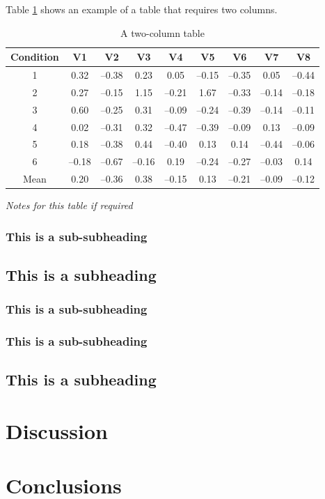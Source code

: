 \documentclass[paper=a4,fontsize=11pt,twocolumn]{article}
\begin{document}
Table \ref{tab:two-column} shows an example of a table that requires two columns.

\begin{table}
\begin{centering}
\caption{A two-column table}\label{tab:two-column}%
	\begin{tabular}[\columnwidth]{ccccccccc}\toprule
	Condition & V1 & V2 & V3 & V4 & V5 & V6 & V7 & V8 \\
	\midrule
	1 & 0.32 & --0.38 & 0.23 & 0.05 & --0.15 & --0.35 & 0.05 & --0.44 \\
	2 & 0.27 & --0.15 & 1.15 & --0.21 & 1.67 & --0.33 & --0.14 & --0.18 \\
	3 & 0.60 & --0.25 & 0.31 & --0.09 & --0.24 & --0.39 & --0.14 & --0.11 \\
	4 & 0.02 & --0.31 & 0.32 & --0.47 & --0.39 & --0.09 & 0.13 & --0.09 \\
	5 & 0.18 & --0.38 & 0.44 & --0.40 & 0.13 & 0.14 & --0.44 & --0.06 \\
	6 & --0.18 & --0.67 & --0.16 & 0.19 & --0.24 & --0.27 & --0.03 & 0.14 \\
	\cmidrule{2-9}
	Mean & 0.20 & --0.36 & 0.38 & --0.15 & 0.13 & --0.21 & --0.09 & --0.12 \\
	\bottomrule
	\end{tabular}\par
	\medskip
\textit{Notes for this table if required}
\end{centering}
\end{table}

\lipsum[12]
\subsubsection{This is a sub-subheading}
\lipsum[13]

\subsection{This is a subheading}
\subsubsection{This is a sub-subheading}
\lipsum[14]
\subsubsection{This is a sub-subheading}
\lipsum[15]

\subsection{This is a subheading}
\lipsum[16-18]

\section{Discussion}
\lipsum[19-23]

\section{Conclusions}
\lipsum[24-32]


\end{document}
